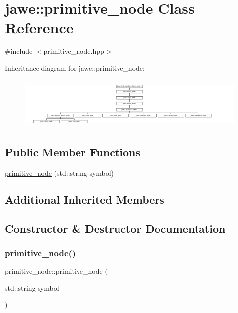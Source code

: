 \hypertarget{classjawe_1_1primitive__node}{}\section{jawe\+:\+:primitive\+\_\+node Class Reference}
\label{classjawe_1_1primitive__node}


{\ttfamily \#include $<$primitive\+\_\+node.\+hpp$>$}

Inheritance diagram for jawe\+:\+:primitive\+\_\+node\+:\begin{figure}[H]
\begin{center}
\leavevmode
\includegraphics[height=2.580645cm]{classjawe_1_1primitive__node}
\end{center}
\end{figure}
\subsection*{Public Member Functions}
\begin{DoxyCompactItemize}
\item 
\hyperlink{classjawe_1_1primitive__node_ad07e8c666aeb53eac22e9170d9e5ba8b}{primitive\+\_\+node} (std\+::string symbol)
\end{DoxyCompactItemize}
\subsection*{Additional Inherited Members}


\subsection{Constructor \& Destructor Documentation}
\mbox{\label{classjawe_1_1primitive__node_ad07e8c666aeb53eac22e9170d9e5ba8b}} 
\subsubsection{\texorpdfstring{primitive\+\_\+node()}{primitive\_node()}}
{\footnotesize\ttfamily primitive\+\_\+node\+::primitive\+\_\+node (\begin{DoxyParamCaption}\item[{std\+::string}]{symbol }\end{DoxyParamCaption})}



